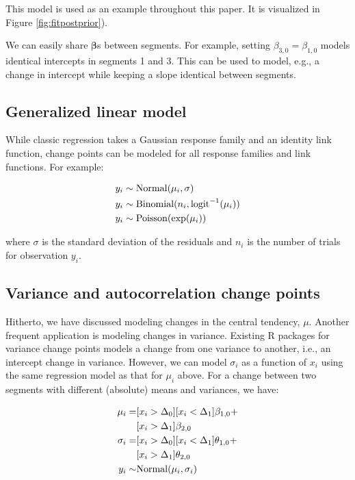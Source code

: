 \documentclass[
  american,
]{article}
\begin{document}
This model is used as an example throughout this paper. It is visualized in Figure \ref{fig:fitpostprior}).

We can easily share \(\mathbf{\beta}\)s between segments. For example, setting \(\beta_{3,0} = \beta_{1,0}\) models identical intercepts in segments 1 and 3. This can be used to model, e.g., a change in intercept while keeping a slope identical between segments.

\hypertarget{generalized-linear-model}{%
\subsection{Generalized linear model}\label{generalized-linear-model}}

While classic regression takes a Gaussian response family and an identity link function, change points can be modeled for all response families and link functions. For example:

\begin{equation}
\begin{aligned}
y_i & \sim {\rm Normal}(\mu_i, \sigma) \\
y_i & \sim {\rm Binomial}(n_i, {\rm logit}^{-1}(\mu_i)) \\
y_i & \sim {\rm Poisson}({\rm exp}(\mu_i))
\end{aligned}
\end{equation}

where \(\sigma\) is the standard deviation of the residuals and \(n_i\) is the number of trials for observation \(y_i\).

\hypertarget{sigmaar-api}{%
\subsection{Variance and autocorrelation change points}\label{sigmaar-api}}

Hitherto, we have discussed modeling changes in the central tendency, \(\mu\). Another frequent application is modeling changes in variance. Existing R packages for variance change points models a change from one variance to another, i.e., an intercept change in variance. However, we can model \(\sigma_i\) as a function of \(x_i\) using the same regression model as that for \(\mu_i\) above. For a change between two segments with different (absolute) means and variances, we have:

\begin{equation}
\begin{aligned}
\mu_i = & [x_i > \Delta_0] [x_i < \Delta_1] \beta_{1, 0} + \\
      & [x_i > \Delta_1] \beta_{2, 0} \\
\sigma_i = & [x_i > \Delta_0] [x_i < \Delta_1] \theta_{1, 0} + \\
           & [x_i > \Delta_1] \theta_{2, 0} \\
y_i \sim & {\rm Normal}(\mu_i, \sigma_i)
\end{aligned}
\end{equation}
\end{document}
